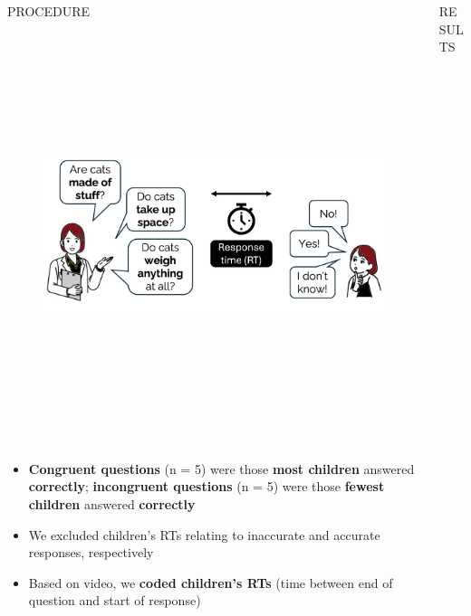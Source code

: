 \documentclass[final]{beamer}
\newlength{\colwidth}
\newlength{\widecolwidth}
\begin{document}
\begin{frame}[t]
\begin{columns}[t]
\begin{column}{\colwidth}
\begin{block}{PROCEDURE}
    \begin{figure}
      \centering
	{\includegraphics[height=12cm]{images/procedure4.png}}
    \end{figure}

    \begin{itemize}
    	\item \textbf{Congruent questions} (n = 5) were those \textbf{most children} answered \textbf{correctly}; \textbf{incongruent questions} (n = 5) were those \textbf{fewest children} answered \textbf{correctly}
	\item We excluded children's RTs relating to inaccurate and accurate responses, respectively
	\item Based on video, we \textbf{coded children's RTs} (time between end of question and start of response)
    \end{itemize}
    
  \end{block}

\end{column}

\begin{column}{\widecolwidth}

  \begin{block}{RESULTS}


\end{block}
\end{column}
\end{columns}
\end{frame}
\end{document}
